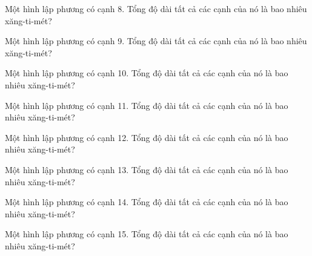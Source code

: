 \begin{ex}
  Một hình lập phương có cạnh 8. Tổng độ dài tất cả các cạnh của nó là bao nhiêu xăng-ti-mét?
\end{ex}

\begin{ex}
  Một hình lập phương có cạnh 9. Tổng độ dài tất cả các cạnh của nó là bao nhiêu xăng-ti-mét?
\end{ex}

\begin{ex}
  Một hình lập phương có cạnh 10. Tổng độ dài tất cả các cạnh của nó là bao nhiêu xăng-ti-mét?
\end{ex}

\begin{ex}
  Một hình lập phương có cạnh 11. Tổng độ dài tất cả các cạnh của nó là bao nhiêu xăng-ti-mét?
\end{ex}

\begin{ex}
  Một hình lập phương có cạnh 12. Tổng độ dài tất cả các cạnh của nó là bao nhiêu xăng-ti-mét?
\end{ex}

\begin{ex}
  Một hình lập phương có cạnh 13. Tổng độ dài tất cả các cạnh của nó là bao nhiêu xăng-ti-mét?
\end{ex}

\begin{ex}
  Một hình lập phương có cạnh 14. Tổng độ dài tất cả các cạnh của nó là bao nhiêu xăng-ti-mét?
\end{ex}

\begin{ex}
  Một hình lập phương có cạnh 15. Tổng độ dài tất cả các cạnh của nó là bao nhiêu xăng-ti-mét?
\end{ex}

